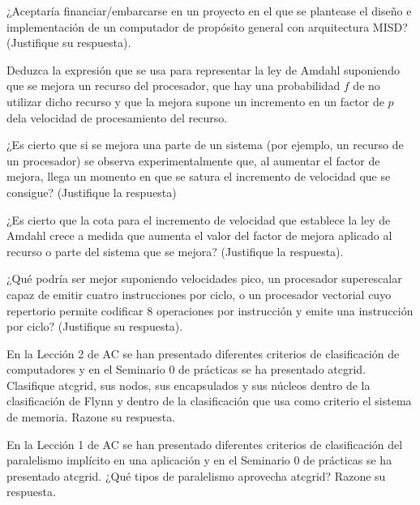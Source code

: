 \begin{cuestion}
    ¿Aceptaría financiar/embarcarse en un proyecto en el que se plantease el diseño e implementación de un
    computador de propósito general con arquitectura MISD? (Justifique su respuesta).
\end{cuestion}

\begin{cuestion}
    Deduzca la expresión que se usa para representar la ley de Amdahl suponiendo que se mejora un
    recurso del procesador, que hay una probabilidad $f$ de no utilizar dicho recurso y que la mejora supone
    un incremento en un factor de $p$ dela velocidad de procesamiento del recurso.
\end{cuestion}

\begin{cuestion}
    ¿Es cierto que si se mejora una parte de un sistema (por ejemplo, un recurso de un procesador) se
    observa experimentalmente que, al aumentar el factor de mejora, llega un momento en que se satura el
    incremento de velocidad que se consigue? (Justifique la respuesta)
\end{cuestion}

\begin{cuestion}
    ¿Es cierto que la cota para el incremento de velocidad que establece la ley de Amdahl crece a medida
    que aumenta el valor del factor de mejora aplicado al recurso o parte del sistema que se mejora?
    (Justifique la respuesta).
\end{cuestion}

\begin{cuestion}
    ¿Qué podría ser mejor suponiendo velocidades pico, un procesador superescalar capaz de emitir
    cuatro instrucciones por ciclo, o un procesador vectorial cuyo repertorio permite codificar 8 operaciones
    por instrucción y emite una instrucción por ciclo? (Justifique su respuesta).
\end{cuestion}

\begin{cuestion}
    En la Lección 2 de AC se han presentado diferentes criterios de clasificación de computadores y en
    el Seminario 0 de prácticas se ha presentado atcgrid. Clasifique atcgrid, sus nodos, sus encapsulados y
    sus núcleos dentro de la clasificación de Flynn y dentro de la clasificación que usa como criterio el
    sistema de memoria. Razone su respuesta.
\end{cuestion}

\begin{cuestion}
    En la Lección 1 de AC se han presentado diferentes criterios de clasificación del paralelismo implícito
    en una aplicación y en el Seminario 0 de prácticas se ha presentado atcgrid. ¿Qué tipos de paralelismo
    aprovecha atcgrid? Razone su respuesta.
\end{cuestion}

